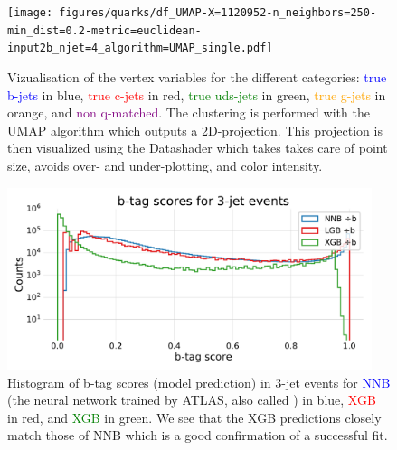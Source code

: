 \begin{figure}
  \texttt{[image: figures/quarks/df\_UMAP-X=1120952-n\_neighbors=250-min\_dist=0.2-metric=euclidean-input2b\_njet=4\_algorithm=UMAP\_single.pdf]}
  \caption[UMAP vizualisation of vertex variables]
          {Vizualisation of the vertex variables for the different categories: \textcolor{blue}{true b-jets} in blue, \textcolor{red}{true c-jets} in red, \textcolor{green}{true uds-jets} in green, \textcolor{orange}{true g-jets} in orange, and \textcolor{purple}{non q-matched}. The clustering is performed with the UMAP algorithm which outputs a 2D-projection. This projection is then visualized using the Datashader which takes takes care of point size, avoids over- and under-plotting, and color intensity. 
          } 
  \label{fig:q:UMAP_vertex}
\end{figure}



\begin{figure}
  \includegraphics[width=0.95\textwidth, trim=0 0 0 30, clip]{figures/quarks/y_pred_3_jet_hist-down_sample=1.00-ML_vars=vertex-selection=b-ejet_min=4-n_iter_RS_lgb=99-n_iter_RS_xgb=9-cdot_cut=0.90-version=19.pdf}
  \caption[b-tag scores in 3-jet events]
          {Histogram of b-tag scores (model prediction) in 3-jet events for \textcolor{blue}{NNB} (the neural network trained by ATLAS, also called ) in blue, \textcolor{red}{XGB} in red, and \textcolor{green}{XGB} in green. We see that the XGB predictions closely match those of NNB which is a good confirmation of a successful fit.  
          } 
  \label{fig:q:btag_scores_3j}
\end{figure}




